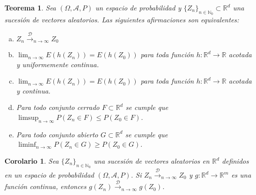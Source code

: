 \documentclass{article}
\newtheorem{theorem}{Teorema}
\newtheorem{corollary}{Corolario}
\begin{document}
\begin{theorem}
Sea $(\Omega, \mathcal{A}, P)$ un espacio de probabilidad y $\{Z_n\}_{n \in \mathbb{N}_0} \subset \mathbb{R}^d$ una sucesión de vectores aleatorios. Las siguientes afirmaciones son equivalentes:
\begin{enumerate}[a)]
    \item $Z_n \xrightarrow{\mathcal{D}}_{n \to \infty} Z_0$
    
    \item $\lim_{n \to \infty} E(h(Z_n)) = E(h(Z_0))$ para toda función $h: \mathbb{R}^d \to \mathbb{R}$ acotada y uniformemente continua.
    
    \item $\lim_{n \to \infty} E(h(Z_n)) = E(h(Z_0))$ para toda función $h: \mathbb{R}^d \to \mathbb{R}$ acotada y continua.
    
    \item Para todo conjunto cerrado $F \subset \mathbb{R}^d$ se cumple que $\limsup_{n \to \infty} P(Z_n \in F) \le P(Z_0 \in F)$.
    
    \item Para todo conjunto abierto $G \subset \mathbb{R}^d$ se cumple que $\liminf_{n \to \infty} P(Z_n \in G) \ge P(Z_0 \in G)$.
\end{enumerate}
\end{theorem}

\begin{corollary}
Sea $\{Z_n\}_{n \in \mathbb{N}_0}$ una sucesión de vectores aleatorios en $\mathbb{R}^d$ definidos en un espacio de probabilidad $(\Omega, \mathcal{A}, P)$. Si $Z_n \xrightarrow{\mathcal{D}}_{n \to \infty} Z_0$ y $g: \mathbb{R}^d \to \mathbb{R}^m$ es una función continua, entonces $g(Z_n) \xrightarrow{\mathcal{D}}_{n \to \infty} g(Z_0)$.
\end{corollary}
\end{document}
